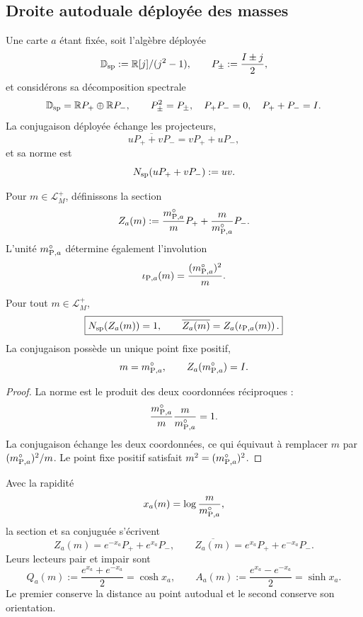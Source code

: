 \subsection{Droite autoduale déployée des masses}

Une carte \(a\) étant fixée, soit l’algèbre déployée
\[
 \mathbb D_{\rm sp}:=\mathbb R[j]/(j^2-1),
 \qquad
 P_\pm:=\frac{I\pm j}{2},
\]
et considérons sa décomposition spectrale
\[
 \mathbb D_{\rm sp}
 =\mathbb R P_+\oplus\mathbb R P_-,
 \qquad
 P_\pm^2=P_\pm,\quad
 P_+P_-=0,\quad
 P_++P_-=I.
\]
La conjugaison déployée échange les projecteurs,
\[
 \overline{uP_++vP_-}=vP_++uP_-,
\]
et sa norme est
\[
 N_{\rm sp}(uP_++vP_-):=uv.
\]

Pour \(m\in\mathcal L_M^+\), définissons la section
\begin{equation}
 Z_a(m)
 :=\frac{m_{{\rm P},a}^{\circ}}{m}P_+
   +\frac{m}{m_{{\rm P},a}^{\circ}}P_- .
 \label{mdg:eq:planck-ct108-seccion-partida-masa-rev3}
\end{equation}
L’unité \(m_{{\rm P},a}^{\circ}\) détermine également l’involution
\begin{equation}
 \iota_{{\rm P},a}(m)
 =\frac{(m_{{\rm P},a}^{\circ})^2}{m}.
 \label{mdg:eq:planck-ct108-involucion-masas-rev3}
\end{equation}

\begin{theorem}
\label{mdg:thm:planck-ct108-recta-partida-masa-rev3}
Pour tout \(m\in\mathcal L_M^+\),
\begin{equation}
 \boxed{
 N_{\rm sp}(Z_a(m))=1,
 \qquad
 \overline{Z_a(m)}
 =Z_a\!\left(\iota_{{\rm P},a}(m)\right).}
 \label{mdg:eq:planck-ct108-norma-conjugacion-rev3}
\end{equation}
La conjugaison possède un unique point fixe positif,
\[
 m=m_{{\rm P},a}^{\circ},
 \qquad
 Z_a(m_{{\rm P},a}^{\circ})=I.
\]
\end{theorem}

\begin{proof}
La norme est le produit des deux coordonnées réciproques :
\[
 \frac{m_{{\rm P},a}^{\circ}}m
 \frac m{m_{{\rm P},a}^{\circ}}=1.
\]
La conjugaison échange les deux coordonnées, ce qui équivaut à remplacer
\(m\) par \((m_{{\rm P},a}^{\circ})^2/m\). Le point fixe positif satisfait
\(m^2=(m_{{\rm P},a}^{\circ})^2\).
\end{proof}

Avec la rapidité
\begin{equation}
 x_a(m)=\log\frac{m}{m_{{\rm P},a}^{\circ}},
 \label{mdg:eq:planck-ct108-rapidez-masa-rev3}
\end{equation}
la section et sa conjuguée s’écrivent
\[
 Z_a(m)=e^{-x_a}P_++e^{x_a}P_-,
 \qquad
 \overline{Z_a(m)}
 =e^{x_a}P_++e^{-x_a}P_-.
\]
Leurs lecteurs pair et impair sont
\begin{equation}
 Q_a(m):=\frac{e^{x_a}+e^{-x_a}}2=\cosh x_a,
 \qquad
 A_a(m):=\frac{e^{x_a}-e^{-x_a}}2=\sinh x_a.
 \label{mdg:eq:planck-ct108-lectores-par-impar-rev3}
\end{equation}
Le premier conserve la distance au point autodual et le second conserve son
orientation.

